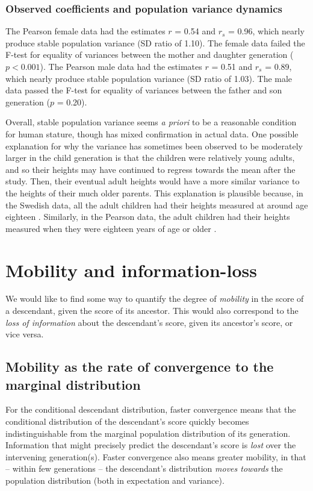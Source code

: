 \documentclass[a4paper,11pt]{article} %
\begin{document}
\subsubsection*{Observed coefficients and population variance dynamics}

The Pearson female data had the estimates $r$ = 0.54 and $r_s$ = 0.96, which nearly produce stable population variance (SD ratio of 1.10). The female data failed the F-test for equality of variances between the mother and daughter generation ($p < 0.001$). The Pearson male data had the estimates $r$ = 0.51 and $r_s$ = 0.89, which nearly produce stable population variance (SD ratio of 1.03). The male data passed the F-test for equality of variances between the father and son generation ($p$ = 0.20). 


Overall, stable population variance seems \emph{a priori} to be a reasonable condition for human stature, though has mixed confirmation in actual data. One possible explanation for why the variance has sometimes been observed to be moderately larger in the child generation is that the children were relatively young adults, and so their heights may have continued to regress towards the mean after the study. Then, their eventual adult heights would have a more similar variance to the heights of their much older parents. This explanation is plausible because, in the Swedish data, all the adult children had their heights measured at around age eighteen \cite{karlberg}. Similarly, in the Pearson data, the adult children had their heights measured when they were eighteen years of age or older \cite{pearson}. 




\section{Mobility and information-loss}

We would like to find some way to quantify the degree of \emph{mobility} in the score of a descendant, given the score of its ancestor. This would also correspond to the \emph{loss of information} about the descendant's score, given its ancestor's score, or vice versa.

\subsection{Mobility as the rate of convergence to the marginal distribution}
For the conditional descendant distribution, faster convergence means that the conditional distribution of the descendant's score quickly becomes indistinguishable from the marginal population distribution of its generation. Information that might precisely predict the descendant's score is \emph{lost} over the intervening generation(s). Faster convergence also means greater mobility, in that -- within few generations -- the descendant's distribution \emph{moves towards} the population distribution (both in expectation and variance). 
\end{document}
